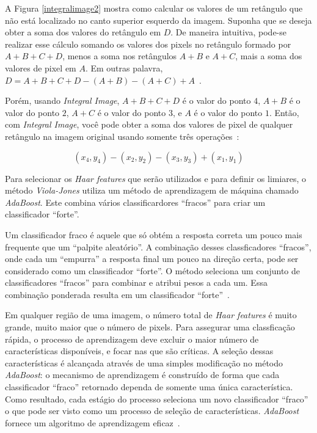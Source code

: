 A Figura \ref{integralimage2} mostra como calcular os valores de um retângulo que não está localizado no canto superior esquerdo da imagem. Suponha que se deseja obter a soma dos valores do retângulo em $\displaystyle D$. De maneira intuitiva, pode-se realizar esse cálculo somando os valores dos pixels no retângulo formado por $\displaystyle A+B+C+D$, menos a soma nos retângulos $\displaystyle A+B$ e $\displaystyle A+C$, mais a soma dos valores de pixel em $\displaystyle A$. Em outras palavra, $\displaystyle D = A+B+C+D-(A+B)-(A+C)+A$~\cite{servodetection, violajones}.

Porém, usando \textit{Integral Image}, $\displaystyle A+B+C+D$ é o valor do ponto $\displaystyle 4$, $\displaystyle A+B$ é o valor do ponto $\displaystyle 2$, $\displaystyle A+C$ é o valor do ponto $\displaystyle 3$, e $\displaystyle A$ é o valor do ponto $\displaystyle 1$. Então, com \textit{Integral Image}, você pode obter a soma dos valores de pixel de qualquer retângulo na imagem original usando somente três operações~\cite{servodetection, violajones}:

	\begin{equation}
		(x_4,y_4) - (x_2,y_2) - (x_3,y_3) + (x_1,y_1)
		\label{equacaointegralimage}
	\end{equation} 

Para selecionar os \textit{Haar features} que serão utilizados e para definir os limiares, o método \textit{Viola-Jones} utiliza um método de aprendizagem de máquina chamado \textit{AdaBoost}. Este combina vários classificardores ``fracos'' para criar um classificador ``forte''. 

Um classificador fraco é aquele que só obtém a resposta correta um pouco mais frequente que um ``palpite aleatório''. A combinação desses classficadores ``fracos'', onde cada um ``empurra'' a resposta final um pouco na direção certa, pode ser considerado como um classificador ``forte''. O método  seleciona um conjunto de classificadores ``fracos'' para combinar e atribui pesos a cada um. Essa combinação ponderada resulta em um classificador ``forte''~\cite{servodetection}.

Em qualquer região de uma imagem, o número total de \textit{Haar features} é muito grande, muito maior que o número de pixels. Para assegurar uma classficação rápida, o processo de aprendizagem deve excluir o maior número de características disponíveis, e focar nas que são críticas. A seleção dessas características é alcançada através de uma simples modificação no método \textit{AdaBoost}: o mecanismo de aprendizagem é construído de forma que cada classificador ``fraco'' retornado dependa de somente uma única característica. Como resultado, cada estágio do processo seleciona um novo classificador ``fraco'' o que pode ser visto como um processo de seleção de características. \textit{AdaBoost} fornece um algoritmo de aprendizagem eficaz~\cite{violajones}.

